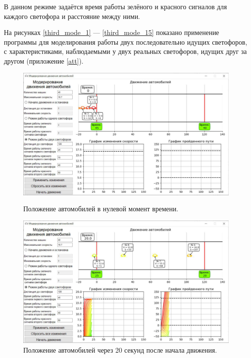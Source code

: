 \documentclass[12pt, a4paper]{extarticle}
\numberwithin{equation}{section}
\numberwithin{figure}{section}
\begin{document}
В данном режиме задаётся время работы зелёного и красного сигналов для каждого светофора и расстояние между ними. 

На рисунках \ref{third_mode_1} --- \ref{third_mode_15} показано применение программы для моделирования работы двух последовательно идущих светофоров, с характеристиками, наблюдаемыми у двух реальных светофоров, идущих друг за другом (приложение \ref{att}).

\begin{figure}[H]
	\begin{center}
		\begin{minipage}[h]{0.48\linewidth}
			\includegraphics[width=1\linewidth]
			{Images/screens/third_mode_1}
			\caption{Положение автомобилей в нулевой момент времени.} 
			\label{third_mode_1}
		\end{minipage}
		\hfill 
		\begin{minipage}[h]{0.48\linewidth}
			\includegraphics[width=1\linewidth]
			{Images/screens/third_mode_2}
			\caption{Положение автомобилей через 20 секунд после начала движения.}
			\label{third_mode_2}
		\end{minipage}
	\end{center}
\end{figure}
\end{document}
